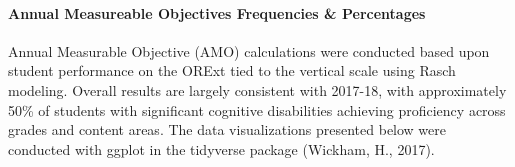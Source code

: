 \documentclass[]{article}
\let\oldparagraph\paragraph
\renewcommand{\paragraph}[1]{\oldparagraph{#1}\mbox{}}
\begin{document}
\hypertarget{annual-measureable-objectives-frequencies-percentages}{%
\paragraph{Annual Measureable Objectives Frequencies \&
Percentages}\label{annual-measureable-objectives-frequencies-percentages}}

Annual Measurable Objective (AMO) calculations were conducted based upon
student performance on the ORExt tied to the vertical scale using Rasch
modeling. Overall results are largely consistent with 2017-18, with
approximately 50\% of students with significant cognitive disabilities
achieving proficiency across grades and content areas. The data
visualizations presented below were conducted with ggplot in the
tidyverse package (Wickham, H., 2017).
\end{document}
